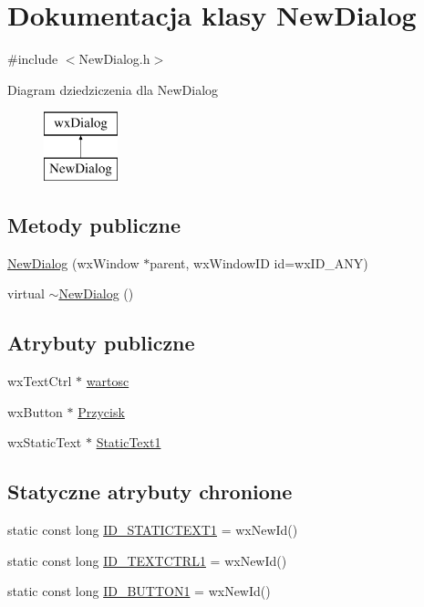 \hypertarget{class_new_dialog}{}\section{Dokumentacja klasy New\+Dialog}
\label{class_new_dialog}


{\ttfamily \#include $<$New\+Dialog.\+h$>$}

Diagram dziedziczenia dla New\+Dialog\begin{figure}[H]
\begin{center}
\leavevmode
\includegraphics[height=2.000000cm]{class_new_dialog}
\end{center}
\end{figure}
\subsection*{Metody publiczne}
\begin{DoxyCompactItemize}
\item 
\mbox{\hyperlink{class_new_dialog_a6910ade228aac35f03cb8840d12b79f7}{New\+Dialog}} (wx\+Window $\ast$parent, wx\+Window\+ID id=wx\+I\+D\+\_\+\+A\+NY)
\item 
virtual \mbox{\hyperlink{class_new_dialog_a971b50e63d72ee512ccf6df01725afa4}{$\sim$\+New\+Dialog}} ()
\end{DoxyCompactItemize}
\subsection*{Atrybuty publiczne}
\begin{DoxyCompactItemize}
\item 
wx\+Text\+Ctrl $\ast$ \mbox{\hyperlink{class_new_dialog_a49642e1118d27d204d51b3fefa910436}{wartosc}}
\item 
wx\+Button $\ast$ \mbox{\hyperlink{class_new_dialog_ad15bf2122e8f06769d1c05f1bc57ce37}{Przycisk}}
\item 
wx\+Static\+Text $\ast$ \mbox{\hyperlink{class_new_dialog_a55766963c57d72db947c9cddae1dbf61}{Static\+Text1}}
\end{DoxyCompactItemize}
\subsection*{Statyczne atrybuty chronione}
\begin{DoxyCompactItemize}
\item 
static const long \mbox{\hyperlink{class_new_dialog_a7a0d550ea58e2fadee155ac45a46c685}{I\+D\+\_\+\+S\+T\+A\+T\+I\+C\+T\+E\+X\+T1}} = wx\+New\+Id()
\item 
static const long \mbox{\hyperlink{class_new_dialog_a873b13e70226c0c50c58a2a31e7c5e6a}{I\+D\+\_\+\+T\+E\+X\+T\+C\+T\+R\+L1}} = wx\+New\+Id()
\item 
static const long \mbox{\hyperlink{class_new_dialog_a19d3f77775795f2dffa1c779f42e26e6}{I\+D\+\_\+\+B\+U\+T\+T\+O\+N1}} = wx\+New\+Id()
\end{DoxyCompactItemize}


